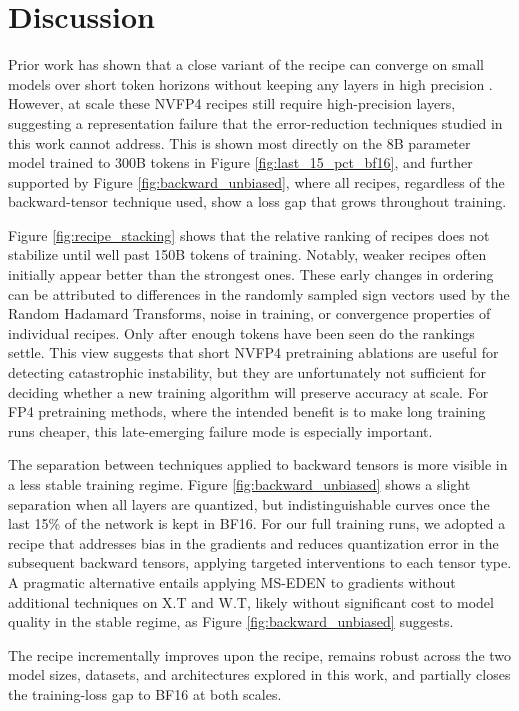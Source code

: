 \section{Discussion}
 Prior work has shown that a close variant of the \newrecipe recipe can converge on small models over short token horizons without keeping any layers in high precision \citep{panferov2026quartetii}. However, at scale these NVFP4 recipes still require high-precision layers, suggesting a representation failure that the error-reduction techniques studied in this work cannot address. This is shown most directly on the 8B parameter model trained to 300B tokens in Figure \ref{fig:last_15_pct_bf16}, and further supported by Figure \ref{fig:backward_unbiased}, where all recipes, regardless of the backward-tensor technique used, show a loss gap that grows throughout training.

 Figure \ref{fig:recipe_stacking} shows that the relative ranking of recipes does not stabilize until well past 150B tokens of training. Notably, weaker recipes often initially appear better than the strongest ones. These early changes in ordering can be attributed to differences in the randomly sampled sign vectors used by the Random Hadamard Transforms, noise in training, or convergence properties of individual recipes. Only after enough tokens have been seen do the rankings settle. This view suggests that short NVFP4 pretraining ablations are useful for detecting catastrophic instability, but they are unfortunately not sufficient for deciding whether a new training algorithm will preserve accuracy at scale. For FP4 pretraining methods, where the intended benefit is to make long training runs cheaper, this late-emerging failure mode is especially important.

 The separation between techniques applied to backward tensors is more visible in a less stable training regime. Figure \ref{fig:backward_unbiased} shows a slight separation when all layers are quantized, but indistinguishable curves once the last 15\% of the network is kept in BF16. For our full training runs, we adopted a recipe that addresses bias in the gradients and reduces quantization error in the subsequent backward tensors, applying targeted interventions to each tensor type. A pragmatic alternative entails applying MS-EDEN to gradients without additional techniques on X.T and W.T, likely without significant cost to model quality in the stable regime, as Figure \ref{fig:backward_unbiased} suggests.

The \newrecipe recipe incrementally improves upon the \nvrecipe recipe, remains robust across the two model sizes, datasets, and architectures explored in this work, and partially closes the training-loss gap to BF16 at both scales.

